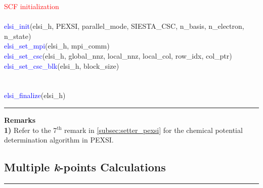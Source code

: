 \documentclass{report}
\begin{document}
\begin{algorithm}[H]
\textcolor{red}{SCF initialization}\\
\hspace{0.3cm}\\
\textcolor{blue}{elsi\_init}(elsi\_h, PEXSI, parallel\_mode, SIESTA\_CSC, n\_basis, n\_electron, n\_state)\\
\textcolor{blue}{elsi\_set\_mpi}(elsi\_h, mpi\_comm)\\
\textcolor{blue}{elsi\_set\_csc}(elsi\_h, global\_nnz, local\_nnz, local\_col, row\_idx, col\_ptr)\\
\textcolor{blue}{elsi\_set\_csc\_blk}(elsi\_h, block\_size)\\
\hspace{0.3cm}\\
\hspace{0.3cm}\\
\textcolor{blue}{elsi\_finalize}(elsi\_h)\\
\end{algorithm}

\noindent\rule{18cm}{0.4pt}

\bigskip
\textbf{Remarks}\\

\textbf{1)} Refer to the 7$^\text{th}$ remark in \ref{subsec:setter_pexsi} for the chemical potential determination algorithm in PEXSI.\\

\subsection{Multiple \textbf{\textit{k}}-points Calculations}
\label{subsec:example_kpt}
\noindent\rule{18cm}{0.4pt}
\end{document}
